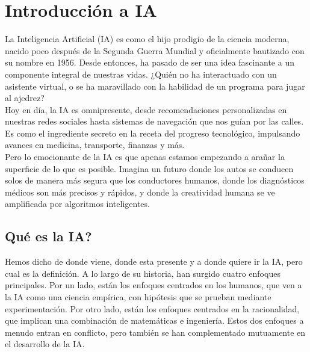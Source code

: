 \section{Introducción a IA}

La Inteligencia Artificial (IA) es como el hijo prodigio de la ciencia moderna, 
nacido poco después de la Segunda Guerra Mundial y oficialmente bautizado con su 
nombre en 1956. Desde entonces, ha pasado de ser una idea fascinante a un componente 
integral de nuestras vidas. ¿Quién no ha interactuado con un asistente virtual, 
o se ha maravillado con la habilidad de un programa para jugar al ajedrez? \\

Hoy en día, la IA es omnipresente, desde recomendaciones personalizadas en nuestras 
redes sociales hasta sistemas de navegación que nos guían por las calles. Es como 
el ingrediente secreto en la receta del progreso tecnológico, impulsando avances 
en medicina, transporte, finanzas y más. \\

Pero lo emocionante de la IA es que apenas estamos empezando a arañar la superficie 
de lo que es posible. Imagina un futuro donde los autos se conducen solos de manera 
más segura que los conductores humanos, donde los diagnósticos médicos son 
más precisos y rápidos, y donde la creatividad humana se ve amplificada 
por algoritmos inteligentes.


\subsection*{Qué es la IA?}

Hemos dicho de donde viene, donde esta presente y a donde quiere ir la IA, pero cual 
es la definición. A lo largo de su historia, han surgido cuatro enfoques principales. 
Por un lado, están los enfoques centrados en los humanos, que ven a la IA como una 
ciencia empírica, con hipótesis que se prueban mediante experimentación. Por otro 
lado, están los enfoques centrados en la racionalidad, que implican una combinación 
de matemáticas e ingeniería. Estos dos enfoques a menudo entran en conflicto, 
pero también se han complementado mutuamente en el desarrollo de la IA.


